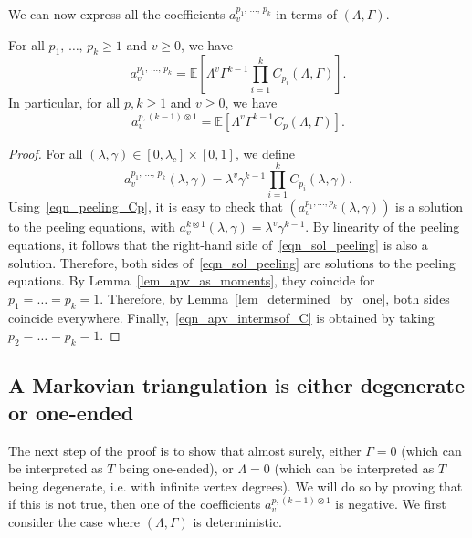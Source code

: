 \documentclass[10pt]{amsart}
\theoremstyle{definition}\newtheorem{defi}[theo]{Definition}\newtheorem{rema}[theo]{Remark}\newtheorem{exam}[theo]{Example}\newtheorem{exem}[theo]{Example}\newtheorem{nota}[theo]{Notation}
\newcommand{\E}{\mathbb{E}}
\begin{document}
We can now express all the coefficients $a_v^{p_1, \,\dots,\,p_k}$ in terms of $(\Lambda, \Gamma)$.

\begin{prop}\label{prop_sol_peeling}
For all $p_1,\,\dots,\,p_k \geq 1$ and $v \geq 0$, we have
\begin{equation}\label{eqn_sol_peeling}
a^{p_1,\,\dots,\,p_k}_v = \E \left[\Lambda^{v} \Gamma^{k-1} \prod_{i=1}^k C_{p_i}(\Lambda, \Gamma)\right].
\end{equation}
In particular, for all $p,k \geq 1$ and $v \geq 0$, we have
\begin{equation}\label{eqn_apv_intermsof_C}
a^{p, (k-1) \otimes 1}_v = \E \left[\Lambda^v \Gamma^{k-1} C_p(\Lambda, \Gamma) \right].
\end{equation}
\end{prop}

\begin{proof}
For all $(\lambda, \gamma) \in [0,\lambda_c] \times [0,1]$, we define
\[
a^{p_1,\,\dots,\,p_k}_v(\lambda, \gamma) = \lambda^{v} \gamma^{k-1} \prod_{i=1}^k C_{p_i}(\lambda, \gamma).
\]
Using~\eqref{eqn_peeling_Cp}, it is easy to check that $\left(a_v^{p_1, \dots, p_k}(\lambda, \gamma) \right)$ is a solution to the peeling equations, with $a_v^{k \otimes 1}(\lambda, \gamma)=\lambda^v \gamma^{k-1}$. By linearity of the peeling equations, it follows that the right-hand side of~\eqref{eqn_sol_peeling} is also a solution. Therefore, both sides of~\eqref{eqn_sol_peeling} are solutions to the peeling equations. By Lemma~\ref{lem_apv_as_moments}, they coincide for $p_1=\dots=p_k=1$. Therefore, by Lemma~\ref{lem_determined_by_one}, both sides coincide everywhere. Finally,~\eqref{eqn_apv_intermsof_C} is obtained by taking $p_2=\dots=p_k=1$.
\end{proof}

\subsection{A Markovian triangulation is either degenerate or one-ended}\label{subsec_degenerate_or_oneended}

The next step of the proof is to show that almost surely, either $\Gamma=0$ (which can be interpreted as $T$ being one-ended), or $\Lambda=0$ (which can be interpreted as $T$ being degenerate, i.e. with infinite vertex degrees). We will do so by proving that if this is not true, then one of the coefficients $a_v^{p,(k-1) \otimes 1}$ is negative. We first consider the case where $(\Lambda, \Gamma)$ is deterministic.
\end{document}
